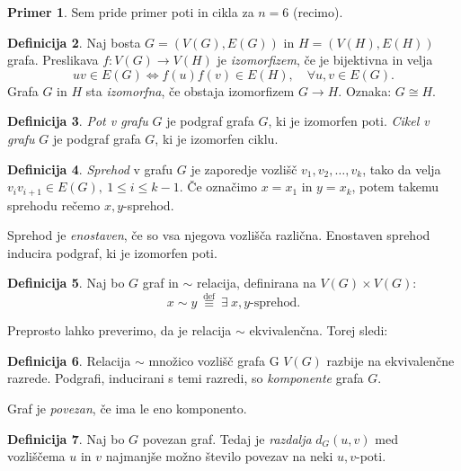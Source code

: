\documentclass[12pt,a4paper]{amsart}
\theoremstyle{definition} %
\newtheorem{definicija}{Definicija}[section]
\newtheorem{primer}[definicija]{Primer}
\theoremstyle{plain} %
\newcommand{\graf}[1]{\ensuremath{#1 = (V(#1), E(#1))}}
\begin{document}
\begin{primer}
	Sem pride primer poti in cikla za $n=6$ (recimo).
\end{primer}

\begin{definicija}
	Naj bosta $\graf{G}$ in $\graf{H}$ grafa. 
	Preslikava $f\colon V(G) \longrightarrow V(H)$ je \emph{izomorfizem}, če je bijektivna in velja
	\[ uv \in E(G) \iff f(u)f(v) \in E(H),\quad \forall u, v \in E(G). \]
	Grafa $G$ in $H$ sta \emph{izomorfna}, če obstaja izomorfizem $G \longrightarrow H$. Oznaka: $G \cong H$.
\end{definicija}

\begin{definicija}
	\emph{Pot v grafu} $G$ je podgraf grafa $G$, ki je izomorfen poti.
	\emph{Cikel v grafu} $G$ je podgraf grafa $G$, ki je izomorfen ciklu. 
\end{definicija}

\begin{definicija}
	\emph{Sprehod} v grafu $G$ je zaporedje vozlišč $v_1, v_2, \ldots, v_k$, tako da velja $v_i v_{i+1} \in E(G),\ 1 \leq i \leq k-1$. Če označimo $x = x_1$ in $y = x_k$, potem takemu sprehodu rečemo $x,y$-sprehod.

	Sprehod je \emph{enostaven}, če so vsa njegova vozlišča različna. Enostaven sprehod inducira podgraf, ki je izomorfen poti.
\end{definicija}

\begin{definicija}
	Naj bo $G$ graf in $\sim$ relacija, definirana na $V(G) \times V(G)$:
	\[ x \sim y \ \stackrel{\text{def}}{\equiv} \ \exists \ x,y \text{-sprehod.} \]
\end{definicija}

Preprosto lahko preverimo, da je relacija $\sim$ ekvivalenčna. Torej sledi:

\begin{definicija}
	Relacija $\sim$ množico vozlišč grafa G $V(G)$ razbije na ekvivalenčne razrede. Podgrafi, inducirani s temi razredi, so \emph{komponente} grafa $G$.
	
	Graf je \emph{povezan}, če ima le eno komponento.
\end{definicija}

\begin{definicija}
	Naj bo $G$ povezan graf. Tedaj je \emph{razdalja} $d_G(u,v)$ med vozliščema $u$ in $v$ najmanjše možno število povezav na neki $u,v$-poti.
\end{definicija}
\end{document}
